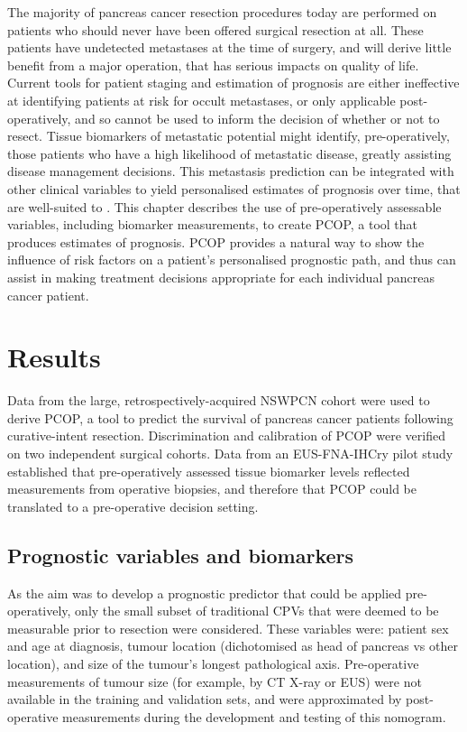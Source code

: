 \documentclass[dissertation.tex]{subfiles}
\begin{document}
The majority of pancreas cancer resection procedures today are performed on patients who should never have been offered surgical resection at all.  These patients have undetected metastases at the time of surgery, and will derive little benefit from a major operation, that has serious impacts on quality of life.  Current tools for patient staging and estimation of prognosis are either ineffective at identifying patients at risk for occult metastases, or only applicable post-operatively, and so cannot be used to inform the decision of whether or not to resect.  Tissue biomarkers of metastatic potential might identify, pre-operatively, those patients who have a high likelihood of metastatic disease, greatly assisting disease management decisions.  This metastasis prediction can be integrated with other clinical variables to yield personalised estimates of prognosis over time, that are well-suited to .  This chapter describes the use of pre-operatively assessable variables, including biomarker measurements, to create \gls{PCOP}, a tool that produces estimates of prognosis.  \Gls{PCOP} provides a natural way to show the influence of risk factors on a patient's personalised prognostic path, and thus can assist in making treatment decisions appropriate for each individual pancreas cancer patient.

\section{Results}
Data from the large, retrospectively-acquired \gls{NSWPCN} cohort were used to derive \gls{PCOP}, a tool to predict the survival of pancreas cancer patients following curative-intent resection.  Discrimination and calibration of \gls{PCOP} were verified on two independent surgical cohorts.  Data from an \gls{EUS}-\gls{FNA}-\acrshort{IHCry} pilot study established that pre-operatively assessed tissue biomarker levels reflected measurements from operative biopsies, and therefore that \gls{PCOP} could be translated to a pre-operative decision setting.

\subsection{Prognostic variables and biomarkers}
As the aim was to develop a prognostic predictor that could be applied pre-operatively, only the small subset of traditional \glspl{CPV} that were deemed to be measurable prior to resection were considered.  These variables were: patient sex and age at diagnosis, tumour location (dichotomised as head of pancreas vs other location), and size of the tumour's longest pathological axis.  Pre-operative measurements of tumour size (for example, by \gls{CT} X-ray or \gls{EUS}) were not available in the training and validation sets, and were approximated by post-operative measurements during the development and testing of this nomogram.  
\end{document}
